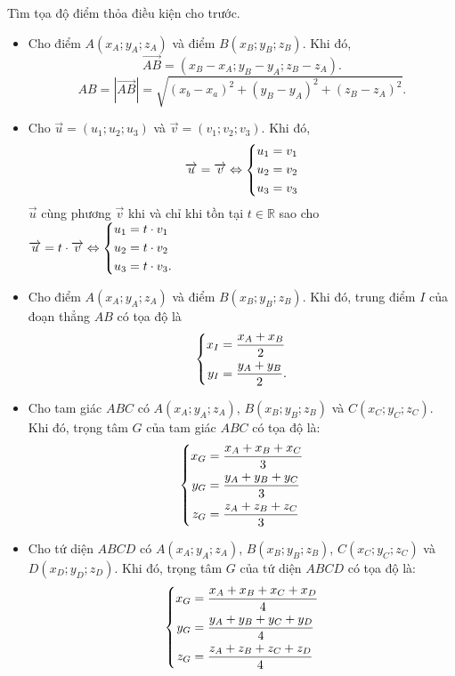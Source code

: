 \begin{dang}{Tìm tọa độ điểm thỏa điều kiện cho trước.}
	\begin{itemize}
		\item  Cho điểm $A\left(x_A;y_A;z_A\right)$ và điểm $B\left(x_B;y_B;z_B\right)$. Khi đó, $$\vec{AB}=\left(x_B-x_A;y_B-y_A;z_B-z_A\right).$$
		$$AB=\left|\vec{AB}\right|=\sqrt{\left(x_b-x_a\right)^2+\left(y_B-y_A\right)^2+\left(z_B-z_A\right)^2}.$$
		\item Cho $\vec{u}=\left(u_1;u_2;u_3\right)$ và $\vec{v}=\left(v_1;v_2;v_3\right)$. Khi đó,
		\begin{equation*}
		\protect\overrightarrow{u}=\protect\overrightarrow{v}\Leftrightarrow \left\{\begin{aligned}&u_1=v_1\\&u_2=v_2\\&u_3=v_3\end{aligned}\right.
		\end{equation*}
		$\vec{u}$ cùng phương $\vec{v}$ khi và chỉ khi tồn tại $t \in \mathbb{R}$ sao cho $\protect\overrightarrow{u}=t\cdot \protect\overrightarrow{v} \Leftrightarrow \left\{\begin{aligned}u_1&=t \cdot v_1\\u_2&=t \cdot v_2\\u_3&=t \cdot v_3.\end{aligned}\right.$
		\item Cho điểm $A\left(x_A;y_A;z_A\right)$ và điểm $B\left(x_B;y_B;z_B\right)$. Khi đó, trung điểm $I$ của đoạn thẳng $AB$ có tọa độ là
		\begin{equation*}
		\left\{\begin{aligned}x_I&=\dfrac{x_A+x_B}{2}\\y_I&=\dfrac{y_A+y_B}{2}.\end{aligned}\right.
		\end{equation*}
		\item Cho tam giác $ABC$ có $A\left(x_A;y_A;z_A\right)$, $B\left(x_B;y_B;z_B\right)$ và $C\left(x_C;y_C;z_C\right)$. Khi đó, trọng tâm $G$ của tam giác $ABC$ có tọa độ là:
		\begin{equation*}
		\left\{\begin{aligned}x_G&=\dfrac{x_A+x_B+x_C}{3}\\y_G&=\dfrac{y_A+y_B+y_C}{3}\\z_G&=\dfrac{z_A+z_B+z_C}{3}\end{aligned}\right.
		\end{equation*}
		\item Cho tứ diện $ABCD$ có $A\left(x_A;y_A;z_A\right)$, $B\left(x_B;y_B;z_B\right)$, $C\left(x_C;y_C;z_C\right)$ và $D\left(x_D;y_D;z_D\right)$. Khi đó, trọng tâm $G$ của tứ diện $ABCD$ có tọa độ là:
		\begin{equation*}
		\left\{\begin{aligned}x_G&=\dfrac{x_A+x_B+x_C+x_D}{4}\\y_G&=\dfrac{y_A+y_B+y_C+y_D}{4}\\z_G&=\dfrac{z_A+z_B+z_C+z_D}{4}\end{aligned}\right.
		\end{equation*}
	\end{itemize}
\end{dang}
